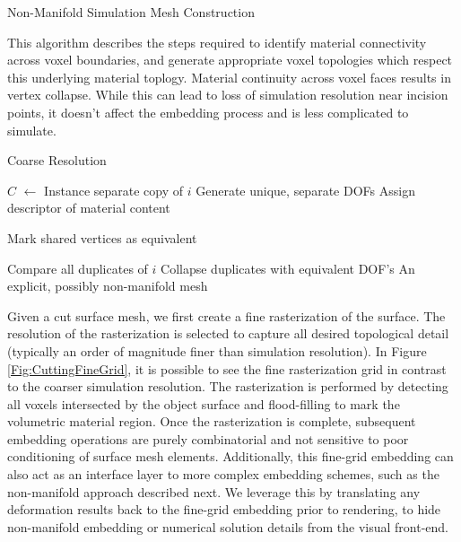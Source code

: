 \begin{algorithm}
  \caption{Non-Manifold Simulation Mesh Construction}{This algorithm
    describes the steps required to identify material connectivity
    across voxel boundaries, and generate appropriate voxel topologies
    which respect this underlying material toplogy. Material
    continuity across voxel faces results in vertex collapse. While
    this can lead to loss of simulation resolution near incision
    points, it doesn't affect the embedding process and is less
    complicated to simulate. }
\label{alg:NonmanifoldMeshGeneration}
\begin{algorithmic}[1]
\Require Coarse Resolution

     \State $C$ $\gets$ 
     \State Instance separate copy of $i$
     \State Generate unique, separate DOFs
     \State Assign descriptor of material content
  \EndFor
\EndFor

            \State Mark shared vertices as equivalent
         \EndIf
      \EndFor
   \EndFor

      \State Compare all duplicates of $i$
      \State Collapse duplicates with equivalent DOF's
   \EndFor
\EndFunction
\Ensure An explicit, possibly non-manifold mesh
\end{algorithmic}
\end{algorithm}


Given a cut surface mesh, we first create a fine rasterization of the
surface. The resolution of the rasterization is selected to capture
all desired topological detail (typically an order of magnitude finer
than simulation resolution). In Figure \ref{Fig:CuttingFineGrid}, it
is possible to see the fine rasterization grid in contrast to the
coarser simulation resolution.  The rasterization is performed by
detecting all voxels intersected by the object surface and
flood-filling to mark the volumetric material region.  Once the
rasterization is complete, subsequent embedding operations are purely
combinatorial and not sensitive to poor conditioning of surface mesh
elements.  Additionally, this fine-grid embedding can also act as an
interface layer to more complex embedding schemes, such as the
non-manifold approach described next. We leverage this by translating
any deformation results back to the fine-grid embedding prior to
rendering, to hide non-manifold embedding or numerical solution
details from the visual front-end.

